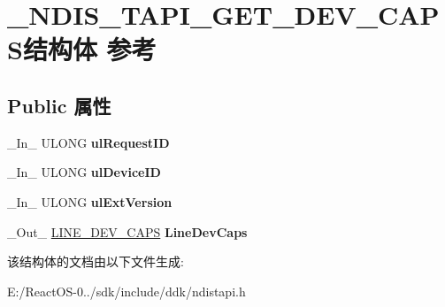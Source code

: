 \hypertarget{struct___n_d_i_s___t_a_p_i___g_e_t___d_e_v___c_a_p_s}{}\section{\+\_\+\+N\+D\+I\+S\+\_\+\+T\+A\+P\+I\+\_\+\+G\+E\+T\+\_\+\+D\+E\+V\+\_\+\+C\+A\+P\+S结构体 参考}
\label{struct___n_d_i_s___t_a_p_i___g_e_t___d_e_v___c_a_p_s}
\subsection*{Public 属性}
\begin{DoxyCompactItemize}
\item 
\mbox{\label{struct___n_d_i_s___t_a_p_i___g_e_t___d_e_v___c_a_p_s_abe3b8beecac8e15d7f36e5628824b09c}} 
\+\_\+\+In\+\_\+ U\+L\+O\+NG {\bfseries ul\+Request\+ID}
\item 
\mbox{\label{struct___n_d_i_s___t_a_p_i___g_e_t___d_e_v___c_a_p_s_a586d570e96e687535775a010ffd63df5}} 
\+\_\+\+In\+\_\+ U\+L\+O\+NG {\bfseries ul\+Device\+ID}
\item 
\mbox{\label{struct___n_d_i_s___t_a_p_i___g_e_t___d_e_v___c_a_p_s_a1f3f717cffa72941a56f4d994b6769dc}} 
\+\_\+\+In\+\_\+ U\+L\+O\+NG {\bfseries ul\+Ext\+Version}
\item 
\mbox{\label{struct___n_d_i_s___t_a_p_i___g_e_t___d_e_v___c_a_p_s_a1d1c19cf47c28adeca804b00aa2b9773}} 
\+\_\+\+Out\+\_\+ \hyperlink{struct___l_i_n_e___d_e_v___c_a_p_s}{L\+I\+N\+E\+\_\+\+D\+E\+V\+\_\+\+C\+A\+PS} {\bfseries Line\+Dev\+Caps}
\end{DoxyCompactItemize}


该结构体的文档由以下文件生成\+:\begin{DoxyCompactItemize}
\item 
E\+:/\+React\+O\+S-\/0../sdk/include/ddk/ndistapi.\+h\end{DoxyCompactItemize}
